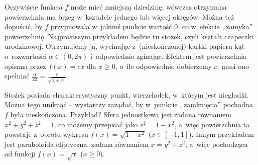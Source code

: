 Oczywiście funkcja $f$ może mieć mniejszą dziedzinę, 
wówczas otrzymana powierzchnia ma brzeg w~kształcie jednego lub więcej okręgów. Można też dopuścić, by $f$ przyjmowała w~jakimś punkcie wartość $0$, co w~efekcie ,,zamyka'' powierzchnię. Najprostszym przykładem będzie tu stożek, czyli kształt czapeczki urodzinowej. Otrzymujemy ją, wycinając z~(nieskończonej) kartki papieru kąt o~rozwartości $\alpha \in (0,2\pi)$ i~odpowiednio zginając. Efektem jest powierzchnia opisana przez $f(x) = cx$ dla $x \ge 0$, o~ile odpowiednio dobierzemy $c$; musi ono spełniać $\frac{\alpha}{2\pi} = \frac{c}{\sqrt{1+c^2}}$. 

Stożek posiada charakterystyczny punkt, wierzchołek, w~którym jest niegładki. Można tego uniknąć -- wystarczy zażądać, by w~punkcie ,,zamknięcia'' pochodna~$f$ była nieskończona. Przykład? Sfera jednostkowa jest zadana równaniem $x^2+y^2+z^2 = 1$, co możemy przepisać jako $r^2 = 1-x^2$, a~więc powierzchnia ta powstaje z~obrotu wykresu $f(x) = \sqrt{1-x^2}$ ($x \in [-1,1]$). Innym przykładem jest paraboloida eliptyczna, zadana równaniem $x = y^2+z^2$, a~więc pochodząca od funkcji $f(x) = \sqrt{x}$ ($x \ge 0$). 

